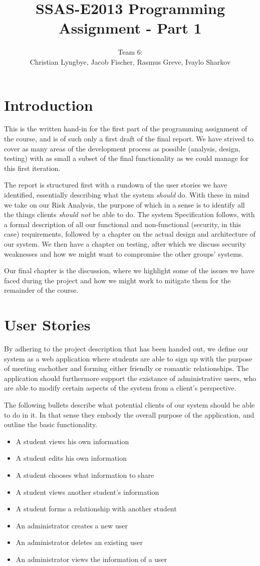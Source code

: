 \documentclass[a4paper]{article}
\title{SSAS-E2013 Programming Assignment - Part 1}
\author{Team 6:\\Christian Lyngbye, Jacob Fischer, Rasmus Greve, Ivaylo Sharkov}
\begin{document}
\maketitle

\section{Introduction}
This is the written hand-in for the first part of the programming assignment of the course, and is of such only a first draft of the final report. We have strived to cover as many areas of the development process as possible (analysis, design, testing) with as small a subset of the final functionality as we could manage for this first iteration.

The report is structured first with a rundown of the user stories we have identified, essentially describing what the system \emph{should} do. With these in mind we take on our Risk Analysis, the purpose of which in a sense is to identify all the things clients \emph{should not} be able to do. The system Specification follows, with a formal description of all our functional and non-functional (security, in this case) requirements, followed by a chapter on the actual design and architecture of our system. We then have a chapter on testing, after which we discuss security weaknesses and how we might want to compromise the other groups' systems.

Our final chapter is the discussion, where we highlight some of the issues we have faced during the project and how we might work to mitigate them for the remainder of the course.

\section{User Stories}
By adhering to the project description that has been handed out, we define our system as a web application where students are able to sign up with the purpose of meeting eachother and forming either friendly or romantic relationships. The application should furthermore support the existance of administrative users, who are able to modify certain aspects of the system from a client's perspective.

The following bullets describe what potential clients of our system should be able to do in it. In that sense they embody the overall purpose of the application, and outline the basic functionality.
\begin{itemize}
\item A student views his own information
\item A student edits his own information
\item A student chooses what information to share
\item A student views another student’s information
\item A student forms a relationship with another student
\item An administrator creates a new user
\item An administrator deletes an existing user
\item An administrator views the information of a user
\end{itemize}
\end{document}

